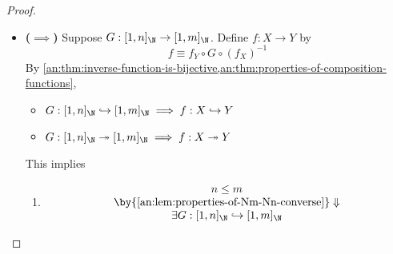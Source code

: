 \begin{proof}
\begin{itemize}
\begin{enumerate}[label=\textbf{(\Alph*)}]
\[\begin{array}{c}
                      \Downarrow                                            \\
                      \exists F: [1, n]_{\N} \twoheadrightarrow [1, m]_{\N} \\
                      \by{\Cref{an:lem:properties-of-Nm-Nn}} \Downarrow     \\
                      n \geq m \geq 1 \lor n = m = 0
                    \end{array}
                  \]
            \item
                  \[
                    \begin{array}{c}
                      \exists f: X \xrightarrow{\sim} Y                     \\
                      \Downarrow                                            \\
                      \exists F: [1, n]_{\N} \xrightarrow{\sim} [1, m]_{\N} \\
                      \by{\Cref{an:lem:properties-of-Nm-Nn}} \Downarrow     \\
                      n = m
                    \end{array}
                  \]
          \end{enumerate}
    \item \textbf{($\implies$)} Suppose $G: [1, n]_{\N} \to [1, m]_{\N}$. Define $f: X \to Y$ by
          \[
            f \equiv f_{Y} \circ G \circ (f_{X})^{-1}
          \]
          By \cref{an:thm:inverse-function-is-bijective,an:thm:properties-of-composition-functions},
          \begin{itemize}
            \item $G: [1, n]_{\N} \hookrightarrow [1, m]_{\N} \implies f: X \hookrightarrow Y$
            \item $G: [1, n]_{\N} \twoheadrightarrow [1, m]_{\N} \implies f: X \twoheadrightarrow Y$
          \end{itemize}
          This implies
          \begin{enumerate}[label=\textbf{(\Alph*)}]
            \item
                  \[
                    \begin{array}{c}
                      n \leq m                                                   \\
                      \by{\Cref{an:lem:properties-of-Nm-Nn-converse}} \Downarrow \\
                      \exists G: [1, n]_{\N} \hookrightarrow [1, m]_{\N}         \\

\end{array}\]
\end{enumerate}
\end{itemize}
\end{proof}

